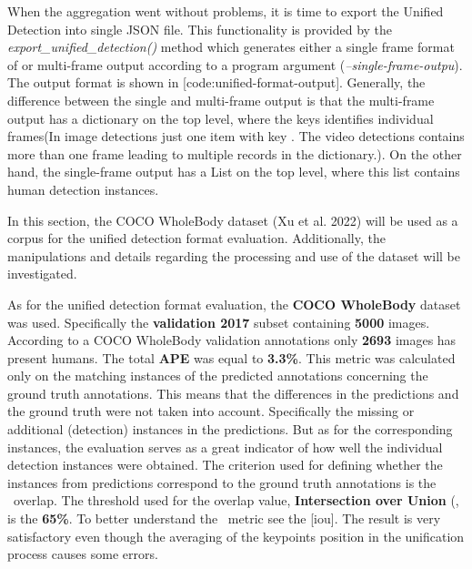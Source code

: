 When the aggregation went without problems, it is time to export the Unified Detection into single JSON file. This functionality is provided by the {\it export_unified_detection()} method which generates either a single frame format of or multi-frame output according to a program argument ({\it --single-frame-outpu}). The output format is shown in [code:unified-format-output]. Generally, the difference between the single and multi-frame output is that the multi-frame output has a dictionary on the top level, where the keys identifies individual frames(In image detections just one item with key . The video detections contains more than one frame leading to multiple records in the dictionary.). On the other hand, the single-frame output has a List on the top level, where this list contains human detection instances.


In this section, the COCO WholeBody dataset (Xu et al. 2022) will be used as a corpus for the unified detection format evaluation. Additionally, the manipulations and details regarding the processing and use of the dataset will be investigated.

As for the unified detection format evaluation, the {\bf COCO WholeBody} dataset was used. Specifically the {\bf validation 2017} subset containing {\bf 5000} images. According to a COCO WholeBody validation annotations only {\bf 2693} images has present humans. The total {\bf APE} was equal to {\bf 3.3\%}. This metric was calculated only on the matching instances of the predicted annotations concerning the ground truth annotations. This means that the differences in the predictions and the ground truth were not taken into account. Specifically the missing or additional (detection) instances in the predictions. But as for the corresponding instances, the evaluation serves as a great indicator of how well the individual detection instances were obtained. The criterion used for defining whether the instances from predictions correspond to the ground truth annotations is the \BBOX\ overlap. The threshold used for the overlap value, {\bf Intersection over Union} (\IoU\), is the {\bf 65\%}. To better understand the \IoU\ metric see the [iou]. The result is very satisfactory even though the averaging of the keypoints position in the unification process causes some errors.

